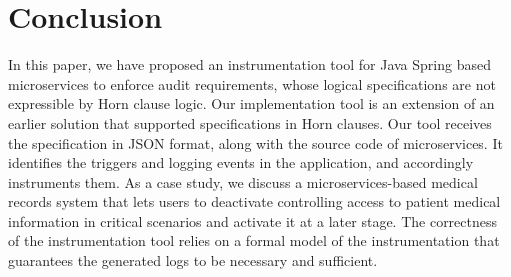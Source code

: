 \section{Conclusion} \label{sec:conclusion}
In this paper, we have proposed an instrumentation tool for Java Spring based microservices to enforce audit requirements, whose logical specifications are not expressible by Horn clause logic. Our implementation tool is an extension of an earlier solution that supported specifications in Horn clauses. Our tool receives the specification in JSON format, along with the source code of microservices. It identifies the triggers and logging events in the application, and accordingly instruments them. As a case study, we discuss a microservices-based medical records system that lets users to deactivate controlling access to patient medical information in critical scenarios and activate it at a later stage. The correctness of the instrumentation tool relies on a formal model of the instrumentation that guarantees the generated logs to be necessary and sufficient.



